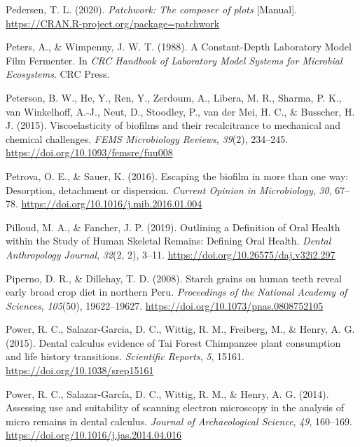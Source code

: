 \documentclass[
  letterpaper,
]{book}
\newlength{\cslhangindent}
\newlength{\cslentryspacingunit} %
\newenvironment{CSLReferences}[2] %
 {%
  \setlength{\parindent}{0pt}
  \ifodd #1
  \let\oldpar\par
  \def\par{\hangindent=\cslhangindent\oldpar}
  \fi
  \setlength{\parskip}{#2\cslentryspacingunit}
 }%
 {}
\begin{document}
\begin{CSLReferences}{1}{0}
\leavevmode{}%
Pedersen, T. L. (2020). \emph{Patchwork: {The} composer of plots}
{[}Manual{]}. \url{https://CRAN.R-project.org/package=patchwork}

\leavevmode{}%
Peters, A., \& Wimpenny, J. W. T. (1988). A {Constant-Depth Laboratory
Model Film Fermenter}. In \emph{{CRC Handbook} of {Laboratory Model
Systems} for {Microbial Ecosystems}}. {CRC Press}.

\leavevmode{}%
Peterson, B. W., He, Y., Ren, Y., Zerdoum, A., Libera, M. R., Sharma, P.
K., van Winkelhoff, A.-J., Neut, D., Stoodley, P., van der Mei, H. C.,
\& Busscher, H. J. (2015). Viscoelasticity of biofilms and their
recalcitrance to mechanical and chemical challenges. \emph{FEMS
Microbiology Reviews}, \emph{39}(2), 234--245.
\url{https://doi.org/10.1093/femsre/fuu008}

\leavevmode{}%
Petrova, O. E., \& Sauer, K. (2016). Escaping the biofilm in more than
one way: Desorption, detachment or dispersion. \emph{Current Opinion in
Microbiology}, \emph{30}, 67--78.
\url{https://doi.org/10.1016/j.mib.2016.01.004}

\leavevmode{}%
Pilloud, M. A., \& Fancher, J. P. (2019). Outlining a {Definition} of
{Oral Health} within the {Study} of {Human Skeletal Remains}: {Defining
Oral Health}. \emph{Dental Anthropology Journal}, \emph{32}(2, 2),
3--11. \url{https://doi.org/10.26575/daj.v32i2.297}

\leavevmode{}%
Piperno, D. R., \& Dillehay, T. D. (2008). Starch grains on human teeth
reveal early broad crop diet in northern {Peru}. \emph{Proceedings of
the National Academy of Sciences}, \emph{105}(50), 19622--19627.
\url{https://doi.org/10.1073/pnas.0808752105}

\leavevmode{}%
Power, R. C., Salazar-Garcia, D. C., Wittig, R. M., Freiberg, M., \&
Henry, A. G. (2015). Dental calculus evidence of {Tai Forest Chimpanzee}
plant consumption and life history transitions. \emph{Scientific
Reports}, \emph{5}, 15161. \url{https://doi.org/10.1038/srep15161}

\leavevmode{}%
Power, R. C., Salazar-García, D. C., Wittig, R. M., \& Henry, A. G.
(2014). Assessing use and suitability of scanning electron microscopy in
the analysis of micro remains in dental calculus. \emph{Journal of
Archaeological Science}, \emph{49}, 160--169.
\url{https://doi.org/10.1016/j.jas.2014.04.016}


\end{CSLReferences}
\end{document}
